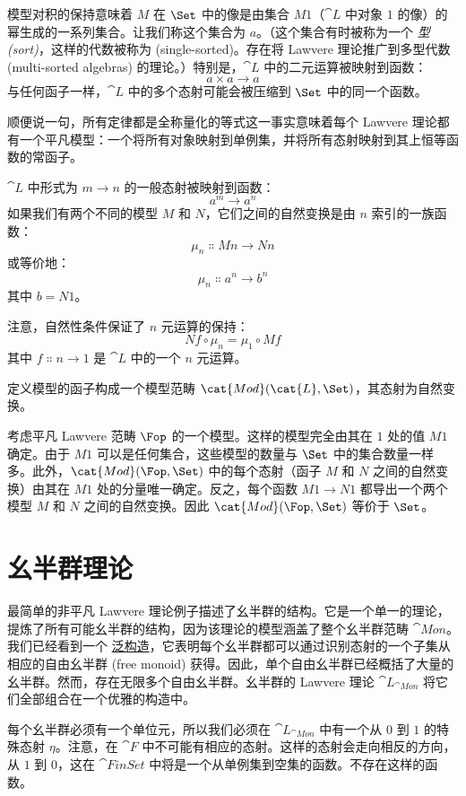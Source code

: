模型对积的保持意味着 $M$ 在 $\Set$ 中的像是由集合 $M 1$（$\cat{L}$ 中对象 $1$ 的像）的幂生成的一系列集合。让我们称这个集合为 $a$。（这个集合有时被称为一个 \emph{型 (sort)}，这样的代数被称为  (single-sorted)。存在将 Lawvere 理论推广到多型代数 (multi-sorted algebras) 的理论。）特别是，$\cat{L}$ 中的二元运算被映射到函数：
\[a \times a \to a\]
与任何函子一样，$\cat{L}$ 中的多个态射可能会被压缩到 $\Set$ 中的同一个函数。

顺便说一句，所有定律都是全称量化的等式这一事实意味着每个 Lawvere 理论都有一个平凡模型：一个将所有对象映射到单例集，并将所有态射映射到其上恒等函数的常函子。

$\cat{L}$ 中形式为 $m \to n$ 的一般态射被映射到函数：
\[a^m \to a^n\]
如果我们有两个不同的模型 $M$ 和 $N$，它们之间的自然变换是由 $n$ 索引的一族函数：
\[\mu_n \Colon M n \to N n\]
或等价地：
\[\mu_n \Colon a^n \to b^n\]
其中 $b = N 1$。

注意，自然性条件保证了 $n$ 元运算的保持：
\[N f \circ \mu_n = \mu_1 \circ M f\]
其中 $f \Colon n \to 1$ 是 $\cat{L}$ 中的一个 $n$ 元运算。

定义模型的函子构成一个模型范畴 $\cat{Mod}(\cat{L}, \Set)$，其态射为自然变换。

考虑平凡 Lawvere 范畴 $\Fop$ 的一个模型。这样的模型完全由其在 $1$ 处的值 $M 1$ 确定。由于 $M 1$ 可以是任何集合，这些模型的数量与 $\Set$ 中的集合数量一样多。此外，$\cat{Mod}(\Fop, \Set)$ 中的每个态射（函子 $M$ 和 $N$ 之间的自然变换）由其在 $M 1$ 处的分量唯一确定。反之，每个函数 $M 1 \to N 1$ 都导出一个两个模型 $M$ 和 $N$ 之间的自然变换。因此 $\cat{Mod}(\Fop, \Set)$ 等价于 $\Set$。

\section{幺半群理论}

最简单的非平凡 Lawvere 理论例子描述了幺半群的结构。它是一个单一的理论，提炼了所有可能幺半群的结构，因为该理论的模型涵盖了整个幺半群范畴 $\cat{Mon}$。我们已经看到一个 \hyperref[free-monoids]{泛构造}，它表明每个幺半群都可以通过识别态射的一个子集从相应的自由幺半群 (free monoid) 获得。因此，单个自由幺半群已经概括了大量的幺半群。然而，存在无限多个自由幺半群。幺半群的 Lawvere 理论 $\cat{L}_{\cat{Mon}}$ 将它们全部组合在一个优雅的构造中。

每个幺半群必须有一个单位元，所以我们必须在 $\cat{L}_{\cat{Mon}}$ 中有一个从 $0$ 到 $1$ 的特殊态射 $\eta$。注意，在 $\cat{F}$ 中不可能有相应的态射。这样的态射会走向相反的方向，从 $1$ 到 $0$，这在 $\cat{FinSet}$ 中将是一个从单例集到空集的函数。不存在这样的函数。

